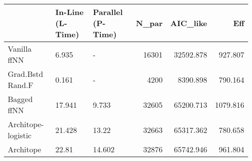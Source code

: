 \begin{tabular}{lllrrr}
\toprule
{} & In-Line (L-Time) & Parallel (P-Time) &  N\_par &   AIC\_like &       Eff \\
\midrule
Vanilla ffNN       &            6.935 &                 - &  16301 &  32592.878 &   927.807 \\
Grad.Bstd Rand.F   &            0.161 &                 - &   4200 &   8390.898 &   790.164 \\
Bagged ffNN        &           17.941 &             9.733 &  32605 &  65200.713 &  1079.816 \\
Architope-logistic &           21.428 &             13.22 &  32663 &  65317.362 &   780.658 \\
Architope          &            22.81 &            14.602 &  32876 &  65742.946 &   961.804 \\
\bottomrule
\end{tabular}
